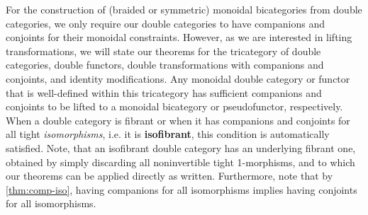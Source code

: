 \begin{rmk}
  For the construction of (braided or symmetric) monoidal bicategories from double categories, we only require our double
  categories to have companions and conjoints for their monoidal constraints.
  However, as we are interested in lifting transformations, we will state our theorems for the tricategory of double categories, double functors, double transformations with companions and conjoints, and identity modifications. Any monoidal double category or functor that is well-defined within this tricategory has sufficient companions and conjoints to be lifted to a monoidal bicategory or pseudofunctor, respectively.
When a double category is fibrant or when it has companions and conjoints for all tight {\it isomorphisms}, i.e. it is {\bf isofibrant}, this condition is automatically satisfied. 
  Note, that an isofibrant double category has an underlying fibrant one, obtained by simply discarding all noninvertible tight 1-morphisms, and to which our theorems can be applied directly as written. Furthermore, note that by \autoref{thm:comp-iso},
  having companions for all isomorphisms implies having conjoints for
  all isomorphisms.  
\end{rmk}

